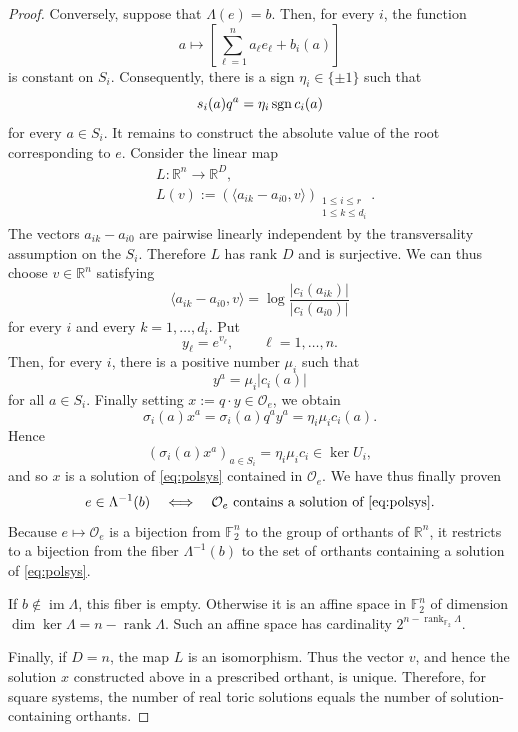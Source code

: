 \documentclass[a4paper]{article}
\theoremstyle{remark}
\def\RR{\mathbb{R}}
\def\FF{\mathbb{F}}
\newcommand{\sgn}{\mathop{\rm sgn}\nolimits}
\begin{document}
\begin{proof}
  Conversely, suppose that $\Lambda(e)=b$. Then, for every $i$, the function
  $$
  a\longmapsto \left[\sum_{\ell=1}^n a_\ell e_\ell+b_i(a)\right]
  $$
  is constant on $S_i$. Consequently, there is a sign
  $\eta_i\in\{\pm1\}$ such that
  $$
  s_i(a)q^a
  =
  \eta_i\sgn c_i(a)
  $$
  for every $a\in S_i$. It remains to construct the absolute value of
  the root corresponding to $e$. Consider the linear map
  \begin{align*}
    &L:\RR^n\longrightarrow\RR^D,\\
    &L(v) := \left(
    \langle a_{ik}-a_{i0},v\rangle\right)_{\substack{1\leq i\leq r\\1\leq k\leq d_i}}.  
  \end{align*}
  The vectors $a_{ik}-a_{i0}$ are pairwise linearly independent by the
  transversality assumption on the $S_i$. Therefore $L$ has rank $D$ and
  is surjective. We can thus choose $v\in\RR^n$ satisfying
  $$
  \langle a_{ik}-a_{i0},v\rangle
  =
  \log\frac{|c_i(a_{ik})|}{|c_i(a_{i0})|}
  $$
  for every $i$ and every $k=1,\ldots,d_i$. Put
  $$
  y_\ell=e^{v_\ell},
  \qquad
  \ell=1,\ldots,n.
  $$
  Then, for every $i$, there is a positive number $\mu_i$ such that
  $$
  y^a=\mu_i|c_i(a)|
  $$
  for all $a\in S_i$. Finally setting $x:=q\cdot y\in\mathcal O_e$, we obtain
  $$
  \sigma_i(a)x^a
  =
  \sigma_i(a)q^ay^a
  =
  \eta_i\mu_i c_i(a).
  $$
  Hence
  $$
  \left(\sigma_i(a)x^a\right)_{a\in S_i}
  =
  \eta_i\mu_i c_i\in\ker U_i,
  $$
  and so $x$ is a solution of \eqref{eq:polsys} contained in $\mathcal O_e$. We have
  thus finally proven
  $$
  e\in\Lambda^{-1}(b)
  \quad\Longleftrightarrow\quad
  \mathcal O_e\text{ contains a solution of \eqref{eq:polsys}}.
  $$
  Because $e\mapsto\mathcal O_e$ is a bijection from $\FF_2^n$ to the group
  of orthants of $\RR^n$, it restricts to a bijection from the fiber
  $\Lambda^{-1}(b)$ to the set of orthants containing a solution of
  \eqref{eq:polsys}.

  If $b\notin\operatorname{im}\Lambda$, this fiber is empty. Otherwise it is an
  affine space in $\FF_2^n$ of dimension
  $\dim\ker \Lambda = n-\operatorname{rank} \Lambda$. Such an affine
  space has cardinality $2^{n-\operatorname{rank}_{\mathbb F_2}\Lambda}$. 

  Finally, if $D=n$, the map $L$ is an isomorphism. Thus the vector
  $v$, and hence the solution $x$ constructed above in a prescribed orthant, is
  unique. Therefore, for square systems, the number of real toric solutions equals
  the number of solution-containing orthants.
\end{proof}
\end{document}
